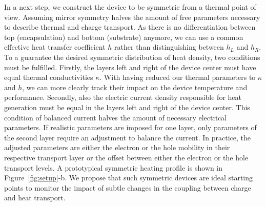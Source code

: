 \documentclass[%
9pt,
 aip,
rsi,%
 amsmath,amssymb,
preprint,%
]{revtex4-1}
\begin{document}
In a next step, we construct the device to be symmetric from a thermal point of view. 
Assuming mirror symmetry halves the amount of free parameters necessary to describe thermal and charge transport. 
As there is no differentiation between top (encapsulation) and bottom (substrate) anymore, we can use a common effective heat transfer coefficient $h$ rather than distinguishing between $h_L$ and $h_R$.
To a guarantee the desired symmetric distribution of heat density, two conditions must be fulfilled.
Firstly, the layers left and right of the device center must have equal thermal conductivities $\kappa$.
With having reduced our thermal parameters to $\kappa$ and $h$, we can more clearly track their impact on the device temperature and performance.
Secondly, also the electric current density responsible for heat generation must be equal in the layers left and right of the device center.
This condition of balanced current halves the amount of necessary electrical parameters.
If realistic parameters are imposed for one layer, only parameters of the second layer require an adjustment to balance the current. 
In practice, the adjusted parameters are either the electron or the hole mobility in their respective transport layer or the offset between either the electron or the hole transport levels. 
A prototypical symmetric heating profile is shown in Figure~\ref{fig:setup}-b. We propose that such symmetric devices are ideal starting points to monitor the impact of subtle changes in the coupling between charge and heat transport.
\end{document}
